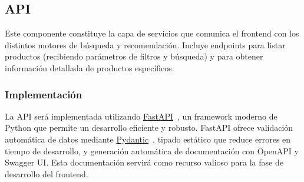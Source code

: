 \documentclass[12pt]{article}
\begin{document}






\subsection{API}

Este componente constituye la capa de servicios que comunica el frontend con los distintos motores de búsqueda y recomendación. Incluye endpoints para listar productos (recibiendo parámetros de filtros y búsqueda) y para obtener información detallada de productos específicos.

\subsubsection{Implementación}

La API será implementada utilizando \href{https://fastapi.tiangolo.com/}{FastAPI}~\cite{FastAPI}, un framework moderno de Python que permite un desarrollo eficiente y robusto. FastAPI ofrece validación automática de datos mediante \href{https://docs.pydantic.dev/latest/}{Pydantic}~\cite{Pydantic}, tipado estático que reduce errores en tiempo de desarrollo, y generación automática de documentación con OpenAPI y Swagger UI. Esta documentación servirá como recurso valioso para la fase de desarrollo del frontend.
\end{document}
